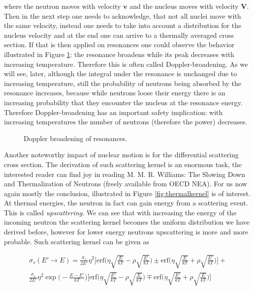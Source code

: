 \noindent where the neutron moves with velocity $\textbf{v}$ and the nucleus moves with velocity $\textbf{V}$. Then in the next step one needs to acknowledge, that not all nuclei move with the same velocity, instead one needs to take into account a distribution for the nucleus velocity and at the end one can arrive to a thermally averaged cross section. If that is then applied on  resonances one could observe the behavior illustrated in Figure \ref{fig:doppler}: the resonance broadens while its peak decreases with increasing temperature. Therefore this is often called Doppler-broadening. As we will see, later, although the integral under the resonance is unchanged due to increasing temperature, still the probability of neutrons being absorbed by the resonance increases, because while neutrons loose their energy there is an increasing probability that they encounter the nucleus at the resonance energy. Therefore Doppler-broadening has an important safety implication: with increasing temperatures the number of neutrons (therefore the power) decreases.

\begin{figure}[ht!]
\protect {}\protect
\caption{\label{fig:doppler} \footnotesize{Doppler broadening of resonances.}}
\end{figure}

Another noteworthy impact of nuclear motion is for the differential scattering cross section. The derivation of such scattering kernel is an enormous task, the interested reader can find joy in reading M. M. R. Williams:  The Slowing Down and Thermalization of Neutrons (freely available from OECD NEA). For us now again mostly the conclusion, illustrated in Figure \ref{fig:thermalkernel} is of interest. At thermal energies, the neutron in fact can gain energy from a scattering event. This is called \textit{upscattering}. We can see that with increasing the energy of the incoming neutron the scattering kernel becomes the uniform distribution we have derived before, however for lower energy neutrons upscattering is more and more probable. Such scattering kernel can be given as


\begin{equation}
\begin{aligned}
\sigma_s(E'\rightarrow E)=\frac{\sigma_s}{2E'}\eta^2\Bigg[\text{erf}\Bigg(\eta\sqrt{\frac{E}{kT}}-\rho\sqrt{\frac{E'}{kT}}\Bigg)\pm \text{erf}\Bigg(\eta\sqrt{\frac{E}{kT}}+\rho\sqrt{\frac{E'}{kT}}\Bigg)\Bigg]+ \\ \frac{\sigma_s}{2E'}\eta^2\exp\Bigg(-\frac{E-E'}{kT}\Bigg)\Bigg[\text{erf}\Bigg(\eta\sqrt{\frac{E'}{kT}}-\rho\sqrt{\frac{E}{kT}}\Bigg)\mp \text{erf}\Bigg(\eta\sqrt{\frac{E'}{kT}}+\rho\sqrt{\frac{E}{kT}}\Bigg)\Bigg]
\end{aligned}
\end{equation}

